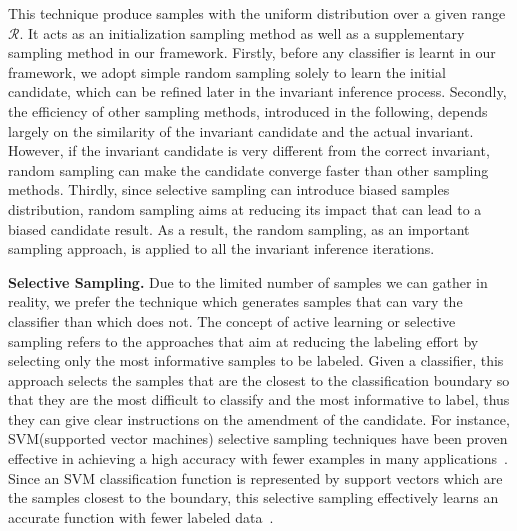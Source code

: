 This technique produce samples with the uniform distribution over a given range $\mathcal{R}$.
It acts as an initialization sampling method
as well as a supplementary sampling method in our framework.
Firstly, before any classifier is learnt in our framework,
we adopt simple random sampling solely to learn the initial candidate,
which can be refined later in the invariant inference process.
Secondly, the efficiency of other sampling methods, introduced in the following,
depends largely on the similarity of the invariant candidate and the actual invariant.
However, if the invariant candidate is very different from the correct invariant,
random sampling can make the candidate converge faster than other sampling methods.
Thirdly, since selective sampling can introduce biased samples distribution,
random sampling aims at reducing its impact that can lead to a biased candidate result.
As a result, the random sampling, as an important sampling approach,
is applied to all the invariant inference iterations.

\medskip\noindent
\textbf{Selective Sampling.}
Due to the limited number of samples we can gather in reality,
we prefer the technique which generates samples that can vary the classifier than which does not.
The concept of active learning or selective sampling refers to the approaches
that aim at reducing the labeling effort by selecting only the most informative samples to be labeled.
Given a classifier, this approach selects the samples that are the closest to the classification boundary
so that they are the most difficult to classify and the most informative to label,
thus they can give clear instructions on the amendment of the candidate.
For instance, SVM(supported vector machines) selective sampling techniques have been proven effective in achieving a high accuracy
with fewer examples in many applications~\cite{DBLP:conf/mm/TongC01,DBLP:journals/jmlr/TongK01}.
Since an SVM classification function is represented by support vectors which are the samples closest to the boundary,
this selective sampling effectively learns an accurate function with fewer labeled data~\cite{DBLP:conf/icml/SchohnC00}.

